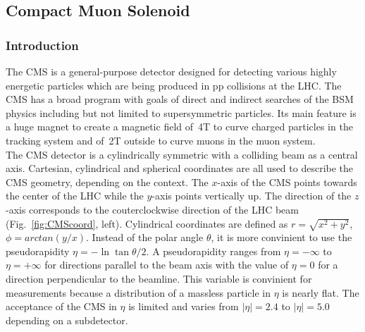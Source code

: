 \subsection{Compact Muon Solenoid}
\label{sec:Exp_CMS}
\subsubsection{Introduction}

The CMS is a general-purpose detector designed for detecting various highly energetic particles which are being produced in pp collisions at the LHC. The CMS has a broad program with goals of direct and indirect searches of the BSM physics including but not limited to supersymmetric particles. Its main feature is a huge magnet to create a magnetic field of~4T to curve charged particles in the tracking system and of~2T outside to curve muons in the muon system.\\

The CMS detector is a cylindrically symmetric with a colliding beam as a central axis. Cartesian, cylindrical and spherical coordinates are all used to describe the CMS geometry, depending on the context. The $x$-axis of the CMS points towards the center of the LHC while the $y$-axis points vertically up. The direction of the $z$-axis corresponds to the couterclockwise direction of the LHC beam (Fig.~\ref{fig:CMScoord}, left). Cylindrical coordinates are defined as $r=\sqrt{x^2+y^2}$, $\phi=arctan(y/x)$. Instead of the polar angle $\theta$, it is more convinient to use the pseudorapidity $\eta=-\ln{\tan{\theta/2}}$. A pseudorapidity ranges from $\eta=-\infty$ to $\eta=+\infty$ for directions parallel to the beam axis with the value of $\eta=0$ for a direction perpendicular to the beamline. This variable is convinient for measurements because a distribution of a massless particle in $\eta$ is nearly flat. The acceptance of the CMS in $\eta$ is limited and varies from $|\eta|=2.4$ to $|\eta|=5.0$ depending on a subdetector.  \\ 

